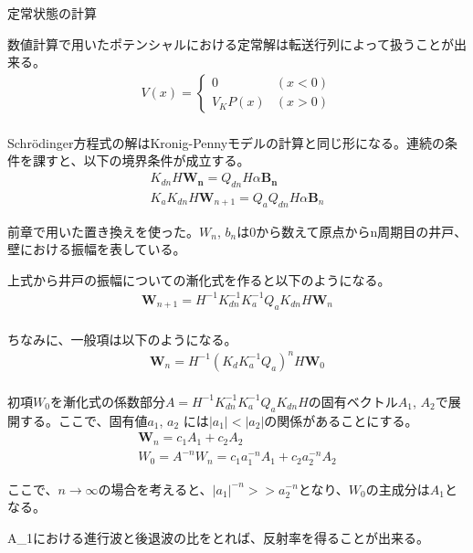 \documentclass[a4paper, lualatex]{bxjsarticle}
\begin{document}
\begin{section}{定常状態の計算}
    \par 数値計算で用いたポテンシャルにおける定常解は転送行列によって扱うことが出来る。
    \begin{align}
     V(x)=\begin{cases}0&(x<0)\\V_KP(x)&(x>0)\end{cases}\nonumber\\
    \end{align}
    \par Schrödinger方程式の解はKronig-Pennyモデルの計算と同じ形になる。連続の条件を課すと、以下の境界条件が成立する。
    \begin{align}
     K_{dn} H \mathbf{W_n} = Q_{dn} H \alpha \mathbf{B_n}\nonumber\\
        K_{a} K_{dn} H \mathbf{W}_{n+1} = Q_a Q_{dn} H \alpha \mathbf{B}_n
    \end{align}
    \par 前章で用いた置き換えを使った。$W_n$, $b_n$は0から数えて原点からn周期目の井戸、壁における振幅を表している。
    \par 上式から井戸の振幅についての漸化式を作ると以下のようになる。
    \begin{align}
     \mathbf{W}_{n+1}= H^{-1} K_{dn}^{-1} K_a^{-1} Q_a K_{dn} H \mathbf{W}_n\nonumber\\
    \end{align}
    \par ちなみに、一般項は以下のようになる。
    \begin{align}
     \mathbf{W}_n = H^{-1} \left( K_d K_a^{-1} Q_a \right)^n H \mathbf{W}_0\nonumber\\
    \end{align}
    \par 初項$W_0$を漸化式の係数部分$A = H^{-1} K_{dn}^{-1} K_a^{-1} Q_a K_{dn} H$の固有ベクトル$A_1$, $A_2$で展開する。ここで、固有値$a_1$, $a_2$ には$|a_1|<|a_2|$の関係があることにする。
    \begin{align}
     \mathbf{W}_n = c_1 A_1 + c_2 A_2\nonumber\\
        W_0 = A^{-n} W_n = c_1 a_1^{-n} A_1 + c_2 a_2^{-n} A_2
    \end{align}
    \par ここで、$n\rightarrow \infty$の場合を考えると、$|a_1|^{-n}>>a_2^{-n}$となり、$W_0$の主成分は$A_1$となる。
    \par A_1における進行波と後退波の比をとれば、反射率を得ることが出来る。
\end{section}
\end{document}
